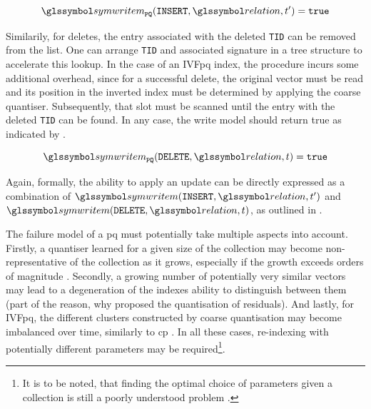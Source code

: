 \begin{equation}
    \label{equation:write_model_insert_pq}
    \symwritem_{\mathtt{PQ}}(\mathtt{INSERT}, \relation, t^{\prime}) = \mathtt{true}
\end{equation}

Similarily, for deletes, the entry associated with the deleted \texttt{TID} can be removed from the list. One can arrange \texttt{TID} and associated signature in a tree structure to accelerate this lookup. In the case of an IVF\acrshort{pq} index, the procedure incurs some additional overhead, since for a successful delete, the original vector must be read and its position in the inverted index must be determined by applying the coarse quantiser. Subsequently, that slot must be scanned until the entry with the deleted \texttt{TID} can be found. In any case, the write model should return true as indicated by .

\begin{equation}
    \label{equation:write_model_delete_pq}
    \symwritem_{\mathtt{PQ}}(\mathtt{DELETE}, \relation, t) = \mathtt{true}
\end{equation}

Again, formally, the ability to apply an update can be directly expressed as a combination of $\symwritem(\mathtt{INSERT}, \relation, t^{\prime})$ and $ \symwritem(\mathtt{DELETE}, \relation, t)$, as outlined in .

The failure model of a \acrshort{pq} must potentially take multiple aspects into account. Firstly, a quantiser learned for a given size of the collection may become non-representative of the collection as it grows, especially if the growth exceeds orders of magnitude \cite{Liu:2020Online}. Secondly, a growing number of potentially very similar vectors may lead to a degeneration of the indexes ability to distinguish between them (part of the reason, why \cite{Jegou:2010Product} proposed the quantisation of residuals). And lastly, for IVF\acrshort{pq}, the different clusters constructed by coarse quantisation may become imbalanced over time, similarly to \acrshort{cp} \cite{Chierichetti:2007Finding}. In all these cases, re-indexing with potentially different parameters may be required\footnote{It is to be noted, that finding the optimal choice of parameters given a collection is still a poorly understood problem \cite{Ge:2014Optimized}.}.